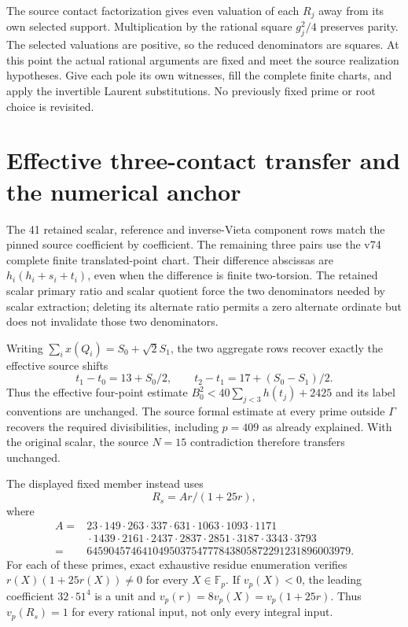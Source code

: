\documentclass[11pt]{article}
\theoremstyle{remark}\newtheorem{remark}[theorem]{Remark}
\begin{document}
The source contact factorization gives even valuation of each $R_j$
away from its own selected support. Multiplication by the rational square
$g_j^2/4$ preserves parity. The selected valuations are positive, so the
reduced denominators are squares. At this point the actual rational
arguments are fixed and meet the source realization hypotheses. Give
each pole its own witnesses, fill the complete finite charts, and apply
the invertible Laurent substitutions. No previously fixed prime or
root choice is revisited.

\section{Effective three-contact transfer and the numerical anchor}
The 41 retained scalar, reference and inverse-Vieta component rows match
the pinned source coefficient by coefficient. The remaining three pairs
use the v74 complete finite translated-point chart. Their difference
abscissas are $h_i(h_i+s_i+t_i)$, even when the difference is finite
two-torsion. The retained scalar primary ratio and scalar quotient force
the two denominators needed by scalar extraction; deleting its alternate
ratio permits a zero alternate ordinate but does not invalidate those
two denominators.

Writing $\sum_i x(Q_i)=S_0+\sqrt2S_1$, the two aggregate rows recover
exactly the effective source shifts
\[
 t_1-t_0=13+S_0/2,\qquad t_2-t_1=17+(S_0-S_1)/2.
\]
Thus the effective four-point estimate
$B_0^2<40\sum_{j<3}h(t_j)+2425$ and its label conventions are
unchanged. The source formal estimate at every prime outside $\Gamma$
recovers the required divisibilities, including $p=409$ as already
explained. With the original scalar, the source $N=15$ contradiction
therefore transfers unchanged.

The displayed fixed member instead uses
\[
 R_s=Ar/(1+25r),
\]
where
\[
\begin{split}
 A={}&23\cdot149\cdot263\cdot337\cdot631\cdot1063\cdot1093\cdot1171\\
 &{}\cdot1439\cdot2161\cdot2437\cdot2837\cdot2851\cdot3187
 \cdot3343\cdot3793\\
 ={}&645904574641049503754777843805872291231896003979.
\end{split}
\]
For each of these primes, exact exhaustive residue enumeration verifies
$r(X)(1+25r(X))\ne0$ for every $X\in\mathbb F_p$. If $v_p(X)<0$,
the leading coefficient $32\cdot51^4$ is a unit and
$v_p(r)=8v_p(X)=v_p(1+25r)$. Thus $v_p(R_s)=1$ for every rational
input, not only every integral input.
\end{document}
